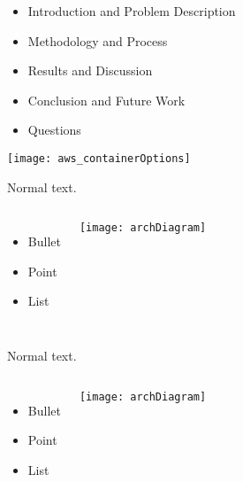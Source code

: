 
\begin{frame}

  \begin{itemize}
    \item Introduction and Problem Description
    \item Methodology and Process
    \item Results and Discussion  
    \item Conclusion and Future Work
    \item Questions
  \end{itemize}

  \texttt{[image: aws\_containerOptions]}  
\end{frame}

\begin{frame}
  Normal text.

  \begin{columns}
      \begin{itemize}
      \item Bullet
      \item Point
      \item List
      \end{itemize}

      \texttt{[image: archDiagram]}
    \end{columns}
  
\end{frame}

\begin{frame}
  Normal text.

  \begin{columns}
      \begin{itemize}
      \item Bullet
      \item Point
      \item List
      \end{itemize}

      \texttt{[image: archDiagram]}
    \end{columns}
  
\end{frame}

